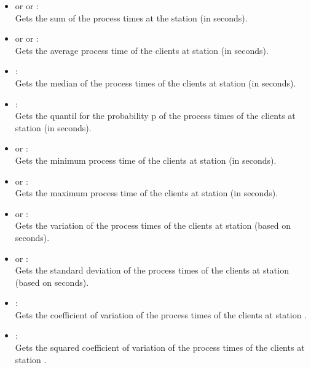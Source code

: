 \begin{itemize}

\item
{} or  or :\\
Gets the sum of the process times at the station  (in seconds).

\item
{} or  or :\\
Gets the average process time of the clients at station  (in seconds).

\item
{}:\\
Gets the median of the process times of the clients at station  (in seconds).

\item
{}:\\
Gets the quantil for the probability p of the process times of the clients at station  (in seconds).

\item
{} or :\\
Gets the minimum process time of the clients at station  (in seconds).

\item
{} or :\\
Gets the maximum process time of the clients at station  (in seconds).

\item
{} or :\\
Gets the variation of the process times of the clients at station  (based on seconds).

\item
{} or :\\
Gets the standard deviation of the process times of the clients at station  (based on seconds).

\item
{}:\\
Gets the coefficient of variation of the process times of the clients at station .

\item
{}:\\
Gets the squared coefficient of variation of the process times of the clients at station .


\end{itemize}
